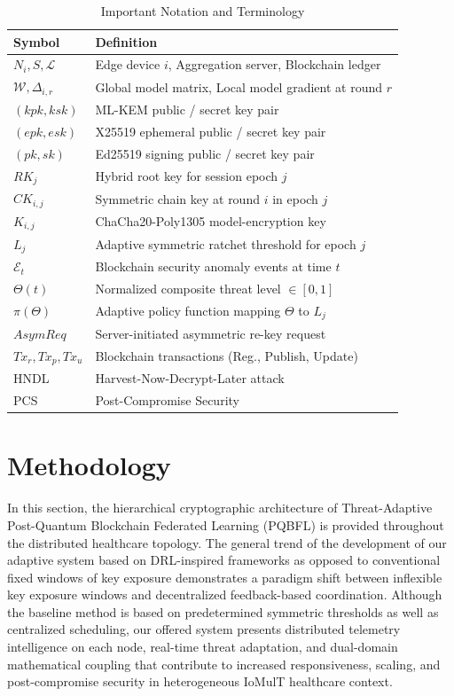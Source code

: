 \documentclass[journal, 10pt, twocolumn]{IEEEtran}
\begin{document}
\begin{table}[htbp]
\centering
\caption{Important Notation and Terminology}
\label{tab:notation}
\begin{tabularx}{\columnwidth}{l X}
\toprule
\textbf{Symbol} & \textbf{Definition} \\
\midrule
$N_i, S, \mathcal{L}$ & Edge device $i$, Aggregation server, Blockchain ledger \\
$\mathcal{W}, \Delta_{i,r}$ & Global model matrix, Local model gradient at round $r$ \\
$(kpk, ksk)$ & ML-KEM public / secret key pair \\
$(epk, esk)$ & X25519 ephemeral public / secret key pair \\
$(pk, sk)$ & Ed25519 signing public / secret key pair \\
$RK_j$ & Hybrid root key for session epoch $j$ \\
$CK_{i,j}$ & Symmetric chain key at round $i$ in epoch $j$ \\
$K_{i,j}$ & ChaCha20-Poly1305 model-encryption key \\
$L_j$ & Adaptive symmetric ratchet threshold for epoch $j$ \\
$\mathcal{E}_t$ & Blockchain security anomaly events at time $t$ \\
$\Theta(t)$ & Normalized composite threat level $\in [0,1]$ \\
$\pi(\Theta)$ & Adaptive policy function mapping $\Theta$ to $L_j$ \\
$AsymReq$ & Server-initiated asymmetric re-key request \\
$Tx_r, Tx_p, Tx_u$ & Blockchain transactions (Reg., Publish, Update) \\
HNDL & Harvest-Now-Decrypt-Later attack \\
PCS & Post-Compromise Security \\
\bottomrule
\end{tabularx}
\end{table}


\section{Methodology}
In this section, the hierarchical cryptographic architecture of Threat-Adaptive Post-Quantum Blockchain Federated Learning (PQBFL) is provided throughout the distributed healthcare topology. The general trend of the development of our adaptive system based on DRL-inspired frameworks as opposed to conventional fixed windows of key exposure demonstrates a paradigm shift between inflexible key exposure windows and decentralized feedback-based coordination. Although the baseline method is based on predetermined symmetric thresholds as well as centralized scheduling, our offered system presents distributed telemetry intelligence on each node, real-time threat adaptation, and dual-domain mathematical coupling that contribute to increased responsiveness, scaling, and post-compromise security in heterogeneous IoMulT healthcare context.
\end{document}
